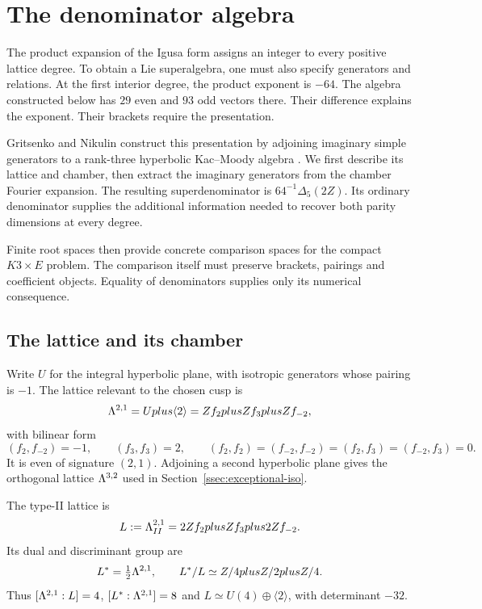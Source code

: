 \chapter{The denominator algebra}
\label{ch:view2-bkm}

The product expansion of the Igusa form assigns an integer to every
positive lattice degree. To obtain a Lie superalgebra, one must also
specify generators and relations. At the first interior degree, the product exponent is $-64$.
The algebra constructed below has $29$ even and $93$ odd vectors there.
Their difference explains the exponent. Their brackets require the
presentation.

Gritsenko and Nikulin construct this presentation by adjoining
imaginary simple generators to a rank-three hyperbolic Kac--Moody
algebra \cite[Sections~2--3 and~6]{GN}. We first describe its lattice
and chamber, then extract the imaginary generators from the chamber
Fourier expansion. The resulting superdenominator is
$64^{-1}\Delta_5(2Z)$. Its ordinary denominator supplies the additional
information needed to recover both parity dimensions at every degree.

Finite root spaces then provide concrete comparison spaces for the
compact $K3\times E$ problem. The comparison itself must preserve
brackets, pairings and coefficient objects. Equality of denominators
supplies only its numerical consequence.

\section{The lattice and its chamber}
\label{sec:bkm-lattice}

Write $U$ for the integral hyperbolic plane, with isotropic generators
whose pairing is $-1$. The lattice relevant to the chosen cusp is
\begin{equation}
\label{eq:bkm-lambda21-def}
 \Lambda^{2,1}=Uplus\langle2\rangle
 =Z f_2plusZ f_3plusZ f_{-2},
\end{equation}
with bilinear form
\begin{equation}
\label{eq:bkm-lambda21-form}
 (f_2,f_{-2})=-1,\qquad (f_3,f_3)=2,\qquad
 (f_2,f_2)=(f_{-2},f_{-2})=(f_2,f_3)=(f_{-2},f_3)=0.
\end{equation}
It is even of signature $(2,1)$. Adjoining a second hyperbolic plane
gives the orthogonal lattice $\Lambda^{3,2}$ used in
Section~\ref{ssec:exceptional-iso}.

\begin{definition}
\label{def:bkm-type-ii-sublattice}
The type-II lattice is
\begin{equation}
\label{eq:bkm-type-ii-def}
 L:=\Lambda^{2,1}_{II}
 =2Z f_2plusZ f_3plus2Z f_{-2}.
\end{equation}
Its dual and discriminant group are
\begin{equation}
\label{eq:bkm-type-ii-dual}
 L^*=\tfrac12\Lambda^{2,1},\qquad
 L^*/L\simeq Z/4plusZ/2plusZ/4.
\end{equation}
Thus $[\Lambda^{2,1}:L]=4$, $[L^*:\Lambda^{2,1}]=8$ and
$L\simeq U(4)\oplus\langle2\rangle$, with determinant $-32$.
\end{definition}

